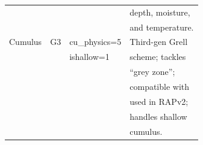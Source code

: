 \begin{tabular}{|l|l|l|l|}
             &               &                             & depth, moisture,\\
             &               &                             & and temperature.\\ \hline
Cumulus      & G3            & cu\_physics=5               & Third-gen Grell\\
             &               & ishallow=1                  & scheme; tackles\\
             &               &                             & ``grey zone''; \\
             &               &                             & compatible with\\
             &               &                             & used in RAPv2; \\
             &               &                             & handles shallow\\
             &               &                             & cumulus.\\ \hline
\end{tabular}\\

